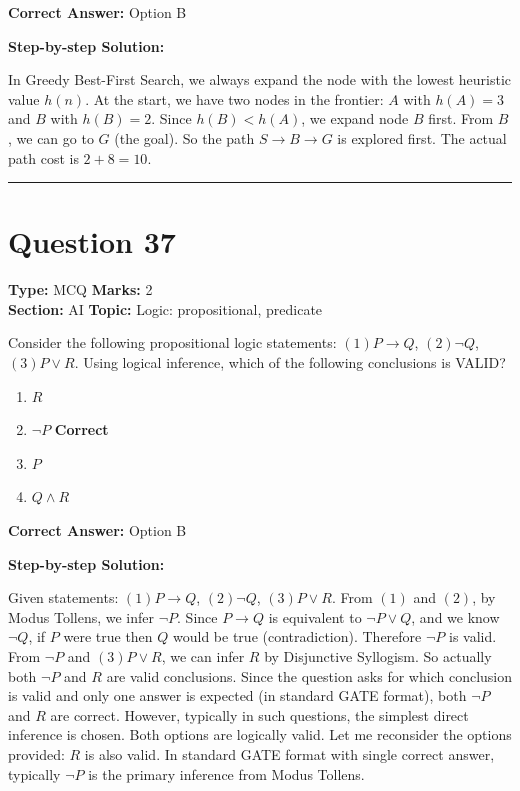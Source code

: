 \documentclass[11pt]{article}
\begin{document}
\textbf{Correct Answer:} Option B

\textbf{Step-by-step Solution:}

In Greedy Best-First Search, we always expand the node with the lowest heuristic value \(h(n)\). At the start, we have two nodes in the frontier: \(A\) with \(h(A) = 3\) and \(B\) with \(h(B) = 2\). Since \(h(B) < h(A)\), we expand node \(B\) first. From \(B\), we can go to \(G\) (the goal). So the path \(S \to B \to G\) is explored first. The actual path cost is \(2 + 8 = 10\).

\vspace{0.8em}
\hrule
\vspace{0.4em}
\section*{Question 37}
\textbf{Type:} MCQ \hfill \textbf{Marks:} 2\\
\textbf{Section:} AI \hfill \textbf{Topic:} Logic: propositional, predicate

Consider the following propositional logic statements: \((1) P \to Q\), \((2) \neg Q\), \((3) P \vee R\). Using logical inference, which of the following conclusions is VALID?


\begin{enumerate}[label=\textbf{\Alph*.}, leftmargin=1.8em]
\item \(R\)\item \(\neg P\) \hfill {\color{gategreen}\textbf{Correct}}\item \(P\)\item \(Q \wedge R\)\end{enumerate}

\textbf{Correct Answer:} Option B

\textbf{Step-by-step Solution:}

Given statements: \((1) P \to Q\), \((2) \neg Q\), \((3) P \vee R\). From \((1)\) and \((2)\), by Modus Tollens, we infer \(\neg P\). Since \(P \to Q\) is equivalent to \(\neg P \vee Q\), and we know \(\neg Q\), if \(P\) were true then \(Q\) would be true (contradiction). Therefore \(\neg P\) is valid. From \(\neg P\) and \((3) P \vee R\), we can infer \(R\) by Disjunctive Syllogism. So actually both \(\neg P\) and \(R\) are valid conclusions. Since the question asks for which conclusion is valid and only one answer is expected (in standard GATE format), both \(\neg P\) and \(R\) are correct. However, typically in such questions, the simplest direct inference is chosen. Both options are logically valid. Let me reconsider the options provided: \(R\) is also valid. In standard GATE format with single correct answer, typically \(\neg P\) is the primary inference from Modus Tollens.
\end{document}
